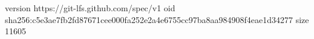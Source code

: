 version https://git-lfs.github.com/spec/v1
oid sha256:c5e3ae7fb2fd87671cee000fa252e2a4e6755cc97ba8aa984908f4eae1d34277
size 11605
